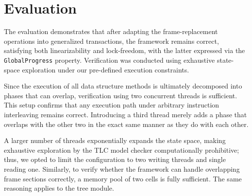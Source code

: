\section{Evaluation}
\label{sec:evaluation}

The evaluation demonstrates that after adapting the frame-replacement operations into generalized transactions, the framework remains correct, satisfying both linearizability and lock-freedom, with the latter expressed via the \texttt{GlobalProgress} property. Verification was conducted using exhaustive state-space exploration under our pre-defined execution constraints.

Since the execution of all data structure methods is ultimately decomposed into phases that can overlap, verification using two concurrent threads is sufficient. This setup confirms that any execution path under arbitrary instruction interleaving remains correct. Introducing a third thread merely adds a phase that overlaps with the other two in the exact same manner as they do with each other.

A larger number of threads exponentially expands the state space, making exhaustive exploration by the TLC model checker computationally prohibitive; thus, we opted to limit the configuration to two writing threads and single reading one. Similarly, to verify whether the framework can handle overlapping frame sections correctly, a memory pool of two cells is fully sufficient. The same reasoning applies to the tree module.
